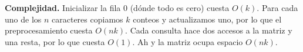 \documentclass{article}
\begin{document}
\begin{enumerate}
        \medskip
        \textbf{Complejidad.} Inicializar la fila 0 (dónde todo es cero) cuesta $O(k)$.
        Para cada uno de los $n$ caracteres copiamos $k$ conteos y
        actualizamos uno, por lo que el preprocesamiento cuesta $O(nk)$. Cada consulta hace dos accesos a la matriz y una
        resta, por lo que cuesta $O(1)$. Ah y la matriz ocupa espacio $O(nk)$.
\end{enumerate}
\end{document}
